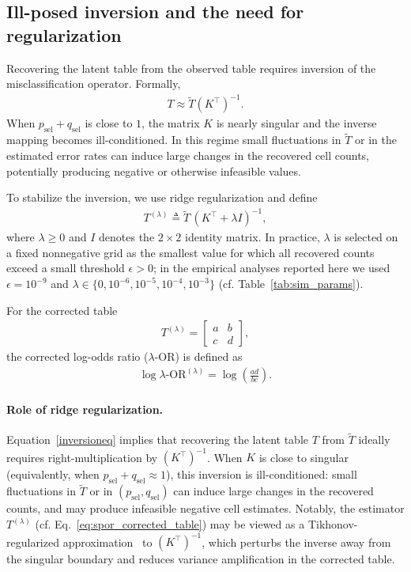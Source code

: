 \documentclass[pdflatex,sn-mathphys-num]{sn-jnl}%
\def\EQSP{3pt}
\newcommand{\cgather}[2][\EQSP]{\begingroup\setlength\abovedisplayskip{#1}\setlength\belowdisplayskip{#1}\begin{gather} #2 \end{gather}\endgroup\noindent}
\newcommand{\SPOR}{\textrm{$\lambda$-OR}}
\newcommand{\logor}{\log\SPOR}
\theoremstyle{thmstyleone}%
\theoremstyle{thmstyletwo}%
\theoremstyle{thmstylethree}%
\begin{document}
\subsection{Ill-posed inversion and the need for regularization}
Recovering the latent table from the observed table requires inversion of the misclassification operator. Formally,
\cgather{
T \approx \tilde T (K^\top)^{-1}. \label{inversioneq}
}%
When $p_{\mathrm{sel}}+q_{\mathrm{sel}}$ is close to $1$, the matrix $K$ is nearly singular and the inverse mapping becomes ill-conditioned. In this regime small fluctuations in $\tilde T$ or in the estimated error rates can induce large changes in the recovered cell counts, potentially producing negative or otherwise infeasible values.

To stabilize the inversion, we use ridge regularization and define
\cgather{
T^{(\lambda)} \triangleq \tilde T\,(K^\top+\lambda I)^{-1},
\label{eq:spor_corrected_table}
}
where $\lambda\ge0$ and $I$ denotes the $2\times2$ identity matrix. In practice, $\lambda$ is selected on a fixed nonnegative grid as the smallest value for which all recovered counts exceed a small threshold $\epsilon>0$; in the empirical analyses reported here we used $\epsilon=10^{-9}$ and $\lambda\in\{0,10^{-6},10^{-5},10^{-4},10^{-3}\}$ (cf. Table~\ref{tab:sim_params}).


For the corrected table
\cgather{
T^{(\lambda)}=
\begin{bmatrix}
a & b\\
c & d
\end{bmatrix},
}
the corrected log-odds ratio ($\SPOR$) is defined as
\cgather{
\logor^{(\lambda)}
=
\log\!\left(\frac{ad}{bc}\right).}
%
\paragraph{Role of ridge regularization.}
Equation~\eqref{inversioneq} implies that recovering the latent table $T$ from $\tilde T$ ideally requires right-multiplication by $(K^\top)^{-1}$. When $K$ is close to singular (equivalently, when $p_{\mathrm{sel}}+q_{\mathrm{sel}}\approx 1$), this inversion is ill-conditioned: small fluctuations in $\tilde T$ or in $(p_{\mathrm{sel}},q_{\mathrm{sel}})$ can induce large changes in the recovered counts, and may produce infeasible negative cell estimates. Notably, the estimator $T^{(\lambda)}$ (cf. Eq.~\eqref{eq:spor_corrected_table}) may be viewed as a Tikhonov-regularized approximation~\cite{tikhonov1963regularization} to $(K^\top)^{-1}$, which perturbs the inverse away from the singular boundary and reduces variance amplification in the corrected table.
\end{document}
